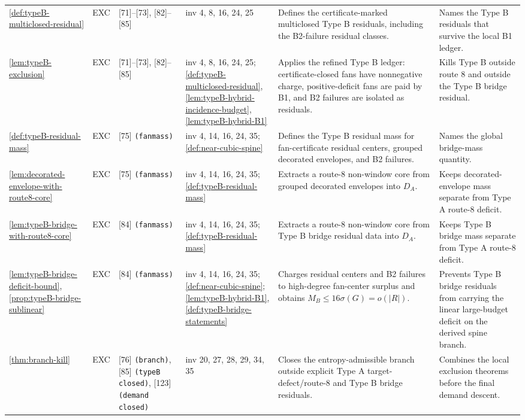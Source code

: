 \documentclass[11pt]{article}
\begin{document}
{\begin{longtable}{L{0.10\textwidth} C{0.045\textwidth} L{0.13\textwidth} L{0.135\textwidth} L{0.28\textwidth} L{0.20\textwidth}}
\cref{def:typeB-multiclosed-residual} & EXC & [71]--[73], [82]--[85] & inv 4, 8, 16, 24, 25 & Defines the certificate-marked multiclosed Type B residuals, including the B2-failure residual classes. & Names the Type B residuals that survive the local B1 ledger. \\
\cref{lem:typeB-exclusion} & EXC & [71]--[73], [82]--[85] & inv 4, 8, 16, 24, 25; \cref{def:typeB-multiclosed-residual}, \cref{lem:typeB-hybrid-incidence-budget}, \cref{lem:typeB-hybrid-B1} & Applies the refined Type B ledger: certificate-closed fans have nonnegative charge, positive-deficit fans are paid by B1, and B2 failures are isolated as residuals. & Kills Type B outside route 8 and outside the Type B bridge residual. \\
\cref{def:typeB-residual-mass} & EXC & [75] \texttt{(fanmass)} & inv 4, 14, 16, 24, 35; \cref{def:near-cubic-spine} & Defines the Type B residual mass for fan-certificate residual centers, grouped decorated envelopes, and B2 failures. & Names the global bridge-mass quantity. \\
\cref{lem:decorated-envelope-with-route8-core} & EXC & [75] \texttt{(fanmass)} & inv 4, 14, 16, 24, 35; \cref{def:typeB-residual-mass} & Extracts a route-8 non-window core from grouped decorated envelopes into \(D_A\). & Keeps decorated-envelope mass separate from Type A route-8 deficit. \\
\cref{lem:typeB-bridge-with-route8-core} & EXC & [84] \texttt{(fanmass)} & inv 4, 14, 16, 24, 35; \cref{def:typeB-residual-mass} & Extracts a route-8 non-window core from Type B bridge residual data into \(D_A\). & Keeps Type B bridge mass separate from Type A route-8 deficit. \\
\cref{lem:typeB-bridge-deficit-bound}, \cref{prop:typeB-bridge-sublinear} & EXC & [84] \texttt{(fanmass)} & inv 4, 14, 16, 24, 35; \cref{def:near-cubic-spine}; \cref{lem:typeB-hybrid-B1}, \cref{def:typeB-bridge-statements} & Charges residual centers and B2 failures to high-degree fan-center surplus and obtains \(M_B\le16\sigma(G)=o(|R|)\). & Prevents Type B bridge residuals from carrying the linear large-budget deficit on the derived spine branch. \\
\cref{thm:branch-kill} & EXC & [76] \texttt{(branch)}, [85] \texttt{(typeB closed)}, [123] \texttt{(demand closed)} & inv 20, 27, 28, 29, 34, 35 & Closes the entropy-admissible branch outside explicit Type A target-defect/route-8 and Type B bridge residuals. & Combines the local exclusion theorems before the final demand descent. \\

\end{longtable}}
\end{document}
